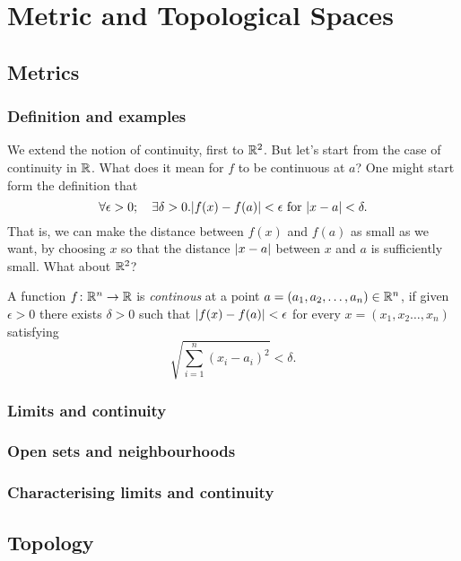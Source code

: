 \documentclass[main.tex]{subfiles}
\begin{document}
	\chapter{Metric and Topological Spaces}
	\section{Metrics}
	\subsection{Definition and examples}
		We extend the notion of continuity, first to $\mathbb R^2$.
		But let's start from the case of continuity in $\mathbb R$. What does it mean for $f$ to be continuous at $a$? One might start form the definition that
		\begin{equation*}
			\forall\epsilon > 0;\quad \exists\delta > 0. \lvert f(x) - f(a)\rvert < \epsilon \text{ for } \lvert x - a\rvert < \delta.
		\end{equation*}
		That is, we can make the distance between $f(x)$ and $f(a)$ as small as we want, by choosing $x$ so that the distance $\lvert x - a\rvert$ between $x$ and $a$ is sufficiently small. What about $\mathbb R^2$?
		\begin{definition}
			A function $f \colon \mathbb R^n \rightarrow \mathbb R$ is \textit{continous} at a point $a = (a_1, a_2, \ldots, a_n) \in \mathbb R^n$, if given $\epsilon >0$ there exists $\delta > 0$ such that $\lvert f(x) - f(a)\rvert < \epsilon$ for every $x = (x_1, x_2 \ldots, x_n)$ satisfying
			\begin{equation*}
				\sqrt{\sum_{i = 1}^{n} \left(x_i - a_i\right)^2} < \delta.
			\end{equation*}
		\end{definition}
	\subsection{Limits and continuity}
	
	\subsection{Open sets and neighbourhoods}
	
	\subsection{Characterising limits and continuity}
	
	\section{Topology}
\end{document}
